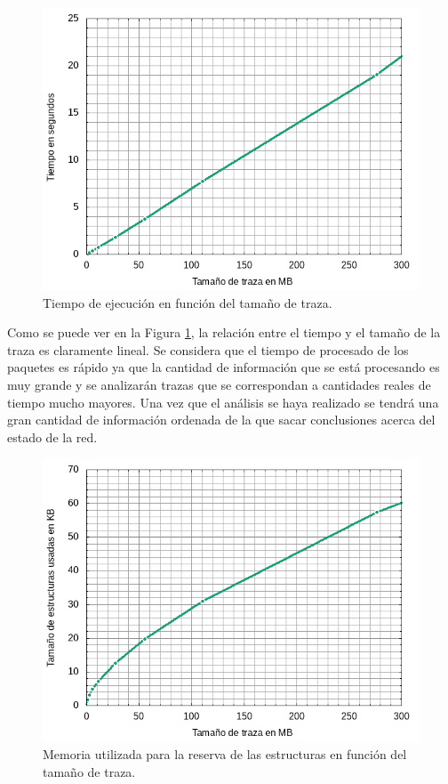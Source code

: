 \documentclass[twoside, 12pt]{epstfg}
\begin{document}
\begin{figure}[H]
\centering
\includegraphics[scale=0.8]{latex/gnuplot/png/time.png}
\caption[Gráfica de tiempo de ejecución]{Tiempo de ejecución en función del tamaño de traza.}
\label{fig:Pruebas:Tiempo}
\end{figure}

Como se puede ver en la Figura \ref{fig:Pruebas:Tiempo}, la relación entre el tiempo y el tamaño de la traza es claramente lineal. Se considera que el tiempo de procesado de los paquetes es rápido ya que la cantidad de información que se está procesando es muy grande y se analizarán trazas que se correspondan a cantidades reales de tiempo mucho mayores. Una vez que el análisis se haya realizado se tendrá una gran cantidad de información ordenada de la que sacar conclusiones acerca del estado de la red.

\begin{figure}[h]
\centering
\includegraphics[scale=0.8]{latex/gnuplot/png/memory-usage.png}
\caption[Gráfica de memoria usada]{Memoria utilizada para la reserva de las estructuras en función del tamaño de traza.}
\label{fig:Pruebas:Memoria}
\end{figure}
\end{document}
